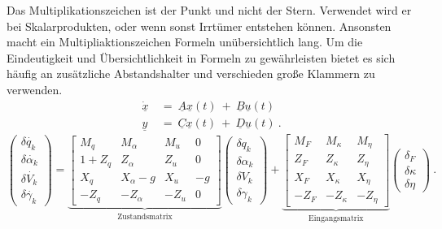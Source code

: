 Das Multiplikationszeichen ist der Punkt und nicht der Stern. Verwendet wird er bei Skalarprodukten, oder wenn sonst Irrtümer entstehen können. Ansonsten macht ein Multipliaktionszeichen Formeln unübersichtlich lang. Um die Eindeutigkeit und Übersichtlichkeit in Formeln zu gewährleisten bietet es sich häufig an zusätzliche Abstandshalter und verschieden große Klammern zu verwenden. 
\begin{equation}
\begin{split}
\dot{\underline{x}}&~=~\underline{A}\underline{x}(t)~+~%
							  \underline{B}\underline{u}(t)\\
\underline{y}&~=~\underline{C}\underline{x}(t)~+~\underline{D}\underline{u}(t)\:.
\end{split}
\label{eq:Gleichung1}
\end{equation} 
\begin{equation}
\begin{pmatrix} 		
	\delta\dot{q_k}		\\
	\delta\dot{\alpha_k}	\\
	\delta\dot{V_k}		\\
	\delta\dot{\gamma_k} \end{pmatrix}%
=\underbrace{\begin{bmatrix}	
	M_q			& M_{\alpha} 	& M_u 	& 0	\\ 
	1+Z_q 		& Z_{\alpha} 	& Z_u	& 0	\\
	X_q			& X_{\alpha}-g	& X_u 	& -g\\
	-Z_q 		& -Z_{\alpha} 	& -Z_u	& 0	\end{bmatrix}}_{\text{Zustandsmatrix}}%
\begin{pmatrix} 		
	\delta{q_k}			\\
	\delta{\alpha_k}	\\
	\delta{V_k}			\\
	\delta{\gamma_k} 	\end{pmatrix}%
+\underbrace{\begin{bmatrix}
	M_{F} 		& M_{\kappa}	& M_{\eta}\\
	Z_{F} 		& Z_{\kappa}	& Z_{\eta}\\
	X_{F} 		& X_{\kappa}	& X_{\eta}\\
	-Z_{F} 		& -Z_{\kappa}	& -Z_{\eta}\end{bmatrix}}_{\text{Eingangsmatrix}}%
\begin{pmatrix}
	\delta_F		\\
	\delta\kappa	\\
	\delta\eta 		\end{pmatrix}\:.
\label{eq:gleichung2}
\end{equation}
